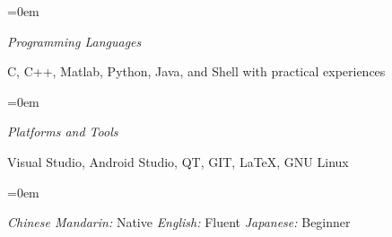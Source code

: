 \documentclass{scrartcl}
\newlength{\datebox}\settowidth{\datebox}{Spring 2014} %
\newcommand{\NewEntry}[3]{\noindent\hangindent=0em\hangafter=0 \parbox{\datebox}{\small \textit{#1}}\hspace{1.5em} #2 #3 %
\vspace{0.5em}} %
\newcommand{\Description}[1]{\hangindent=0em\hangafter=0\noindent\raggedright\footnotesize{#1}\par\normalsize\vspace{1em}} %
\begin{document}
\begin{cv}{}
\vspace{1em}

\NewEntry{Programming Languages}{C, C++, Matlab, Python, Java, and Shell with practical experiences}

\vspace{0.5em} %

\NewEntry{Platforms and Tools}{Visual Studio, Android Studio, QT, GIT, \LaTeX, GNU Linux}

\vspace{1.5em} %


\vspace{0.5em}

\Description{\textit{Chinese Mandarin: } Native  \qquad   \textit{English: } Fluent \qquad \textit{Japanese: } Beginner}


\end{cv}
\end{document}
